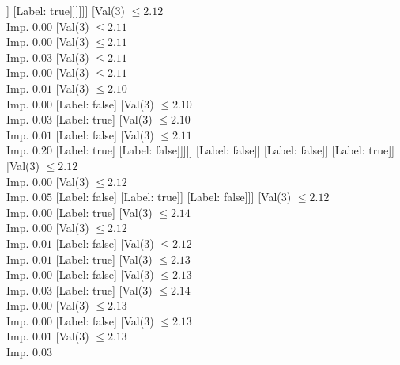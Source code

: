 \documentclass[margin=10pt]{standalone}
\begin{document}
\begin{forest}
														[Val($3$) $ \leq 2.10$ \\ Imp. $0.12$
															[Label: true]
															[Label: false]]
														[Label: true]]]]]]
									[Val($3$) $ \leq 2.12$ \\ Imp. $0.00$
										[Val($3$) $ \leq 2.11$ \\ Imp. $0.00$
											[Val($3$) $ \leq 2.11$ \\ Imp. $0.03$
												[Val($3$) $ \leq 2.11$ \\ Imp. $0.00$
													[Val($3$) $ \leq 2.11$ \\ Imp. $0.01$
														[Val($3$) $ \leq 2.10$ \\ Imp. $0.00$
															[Label: false]
															[Val($3$) $ \leq 2.10$ \\ Imp. $0.03$
																[Label: true]
																[Val($3$) $ \leq 2.10$ \\ Imp. $0.01$
																	[Label: false]
																	[Val($3$) $ \leq 2.11$ \\ Imp. $0.20$
																		[Label: true]
																		[Label: false]]]]]
														[Label: false]]
													[Label: false]]
												[Label: true]]
											[Val($3$) $ \leq 2.12$ \\ Imp. $0.00$
												[Val($3$) $ \leq 2.12$ \\ Imp. $0.05$
													[Label: false]
													[Label: true]]
												[Label: false]]]
										[Val($3$) $ \leq 2.12$ \\ Imp. $0.00$
											[Label: true]
											[Val($3$) $ \leq 2.14$ \\ Imp. $0.00$
												[Val($3$) $ \leq 2.12$ \\ Imp. $0.01$
													[Label: false]
													[Val($3$) $ \leq 2.12$ \\ Imp. $0.01$
														[Label: true]
														[Val($3$) $ \leq 2.13$ \\ Imp. $0.00$
															[Label: false]
															[Val($3$) $ \leq 2.13$ \\ Imp. $0.03$
																[Label: true]
																[Val($3$) $ \leq 2.14$ \\ Imp. $0.00$
																	[Val($3$) $ \leq 2.13$ \\ Imp. $0.00$
																		[Label: false]
																		[Val($3$) $ \leq 2.13$ \\ Imp. $0.01$
																			[Val($3$) $ \leq 2.13$ \\ Imp. $0.03$

\end{forest}
\end{document}
